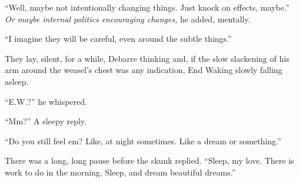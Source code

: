 ``Well, maybe not intentionally changing things. Just knock on effects, maybe.'' \emph{Or maybe internal politics encouraging changes,} he added, mentally.

``I imagine they will be careful, even around the subtle things.''

They lay, silent, for a while, Debarre thinking and, if the slow slackening of his arm around the weasel's chest was any indication, End Waking slowly falling asleep.

``E.W.?'' he whispered.

``Mm?'' A sleepy reply.

``Do you still feel em? Like, at night sometimes. Like a dream or something.''

There was a long, long pause before the skunk replied. ``Sleep, my love. There is work to do in the morning. Sleep, and dream beautiful dreams.''
